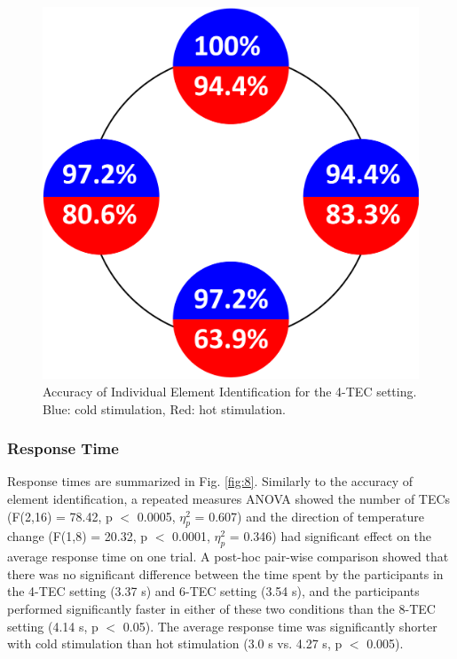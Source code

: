 \documentclass[preprint,12pt]{elsarticle}
\begin{document}
\begin{figure}[h]
  \centering
  \includegraphics[width=0.4\columnwidth]{img/fig7.pdf}
  \caption{Accuracy of Individual Element Identification for the 4-TEC setting. Blue: cold stimulation, Red: hot stimulation.}
  \label{fig:7}
\end{figure}

\subsubsection{Response Time}

Response times are summarized in Fig. \ref{fig:8}. Similarly to the accuracy of element identification, a repeated measures ANOVA showed the number of TECs (F(2,16) = 78.42, p $<$ 0.0005, $\eta_p^2$ = 0.607) and the direction of temperature change (F(1,8) = 20.32, p $<$ 0.0001, $\eta_p^2$ = 0.346) had significant effect on the average response time on one trial. A post-hoc pair-wise comparison showed that there was no significant difference between the time spent by the participants in the 4-TEC setting (3.37 s) and 6-TEC setting (3.54 s), and the participants performed significantly faster in either of these two conditions than the 8-TEC setting (4.14 s, p $<$ 0.05). The average response time was significantly shorter with cold stimulation than hot stimulation (3.0 s vs. 4.27 s, p $<$ 0.005).
\end{document}
